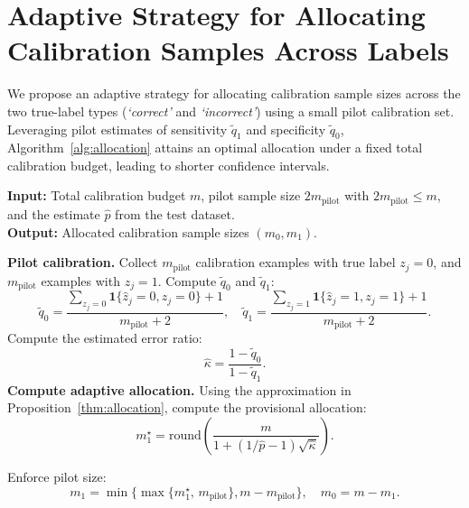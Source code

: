 \clearpage
\section{Adaptive Strategy for Allocating Calibration Samples Across Labels}

We propose an adaptive strategy for allocating calibration sample sizes across the two true-label types (\emph{`correct'} and \emph{`incorrect'}) using a small pilot calibration set. Leveraging pilot estimates of sensitivity $\tilde{q}_1$ and specificity $\tilde{q}_0$, Algorithm~\ref{alg:allocation} attains an optimal allocation under a fixed total calibration budget, leading to shorter confidence intervals.

\begin{algorithm}[h!]
\caption{Adaptive strategy for allocating calibration sample sizes across true label types}
\label{alg:allocation}
{\bfseries Input:} Total calibration budget $m$, pilot sample size $2m_{\mathrm{pilot}}$ with $2m_{\mathrm{pilot}} \le m$, and the estimate $\hat{p}$ from the test dataset. \\
{\bfseries Output:} Allocated calibration sample sizes $(m_0, m_1)$.
\begin{algorithmic}[1]
\STATE \textbf{Pilot calibration.}
\STATE \hspace{1em} Collect $m_{\mathrm{pilot}}$ calibration examples with true label $z_j = 0$, and $m_{\mathrm{pilot}}$ examples with $z_j = 1$.
\STATE \hspace{1em} Compute $\tilde{q}_0$ and $\tilde{q}_1$:
\[
\tilde{q}_0 = \frac{\sum_{z_j=0} \mathbf{1}\{ \hat{z}_j = 0, z_j = 0\}+1}{m_{\mathrm{pilot}}+2}, 
\quad
\tilde{q}_1 = \frac{\sum_{z_j=1} \mathbf{1}\{ \hat{z}_j =1, z_j = 1\}+1}{m_{\mathrm{pilot}}+2}.
\]
\STATE  \hspace{1em} Compute the estimated error ratio: 
\[
    \hat{\kappa} = \frac{1 - \tilde{q}_0}{1 - \tilde{q}_1}.
\]
\STATE \textbf{Compute adaptive allocation.}
\STATE  \hspace{1em} Using the approximation in Proposition~\ref{thm:allocation}, compute the provisional allocation:
\[
m_1^\star = \mathrm{round}\left( \frac{m}{1 + (1/\hat{p} -1) \sqrt{\hat{\kappa}}} \right).
\]

\STATE  \hspace{1em} Enforce pilot size:
\[
m_1 = \min\big\{ \max\{m_1^\star,\, m_{\mathrm{pilot}}\}, m-m_{\mathrm{pilot}} \big\}
, \quad
m_0 = m - m_1.
\]
\end{algorithmic}
\end{algorithm}

